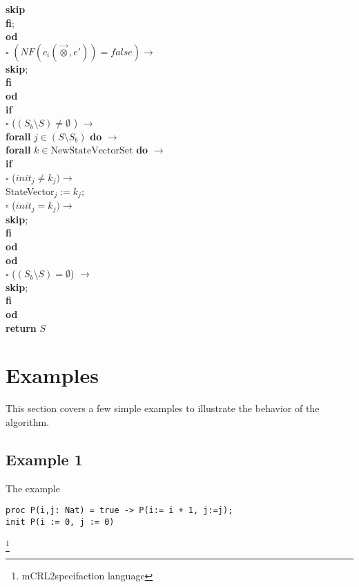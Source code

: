\documentclass[a4paper,10pt]{article}
\newcommand{\ovr}{\overrightarrow}
\newcommand{\mcrl}{mCRL2}
\newcommand{\tb}{\textbf}
\newcommand{\ra}{$\rightarrow$}
\newcommand{\sq}{$\square$}
\begin{document}
\begin{tabbing}
  \>	\>	\> 	\>    	\>        \> \>  \tb{skip}\\
  \>	\>	\> 	\> 	\>          \tb{fi}; \\
  \>	\>	\>	\> \tb{od}\\
  \>	\>	\sq 	\>  $(NF(c_i(\ovr{\otimes},e')) = false) \rightarrow$ \\
  \>	\>	\> 	\>\tb{skip};\\
  \>	\>	\tb{fi}\\
  \>	\tb{od} \\
  \>	\tb{if}  \\
  \>	\sq	\> ($( S_{b} \setminus S) \neq \emptyset $ ) \ra \\ 
  \>	\>	\> 	\tb{forall}  $j \in ( S \setminus S_b) $ \tb{do} $\rightarrow$\\
  \>	\>	\>  	\> 	\tb{forall} $k \in \text{NewStateVectorSet}$ \tb{do} $\rightarrow$ \\
  \>	\>	\> 	\> 	\>   	\tb{if} \\
  \>	\>	\>  	\> 	\> 	\sq 	\>	($init_j \not= k_j) \rightarrow$ \\
  \>	\>	\>	\>	\>	\>	\>	\>	StateVector$_j := k_j$; \\
  \> 	\>	\>	\>	\>	\sq	\>	($init_j = k_j) \rightarrow$ \\
  \>	\>	\>	\>	\>	\>	\>	\>	\tb{skip};\\
  \>	\>	\>	\>	\>	\tb{fi}\\
  \> 	\>	\>	\>	\tb{od}\\
  \>	\>	\>	\tb{od}\\
  \>	\sq	\>  	($ (S_b \setminus S) = \emptyset $) \ra  \\
  \>	\> 	\>  	\>	\tb{skip};\\
  \>	\tb{fi} \\
  \tb{od}\\
  \tb{return} $S$
\end{tabbing} 

\section{Examples}
This section covers a few simple examples to illustrate the behavior of the algorithm. 
\subsection{Example 1} The example \\
\begin{verbatim}
proc P(i,j: Nat) = true -> P(i:= i + 1, j:=j);
init P(i := 0, j := 0)
\end{verbatim} \footnote{\mcrl specifaction language}
\end{document}

